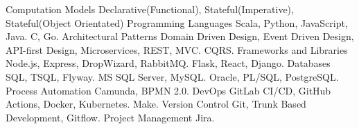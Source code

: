   \begin{cvskills}
    \cvskill
      {Computation Models} %
      { Declarative(Functional), Stateful(Imperative), Stateful(Object Orientated)} %
    \cvskill
      {Programming Languages} %
      {  Scala, Python, JavaScript, Java.}
    \cvskill
      {} %
      {  C, Go.}
    \cvskill
      {Architectural Patterns} %
      {  Domain Driven Design, Event Driven Design, API-first Design, Microservices, REST, MVC.}
    \cvskill
      {} %
      {  CQRS.}
    \cvskill
      {Frameworks and Libraries} %
      {  Node.js, Express, DropWizard, RabbitMQ.}
    \cvskill
      {}
      {  Flask, React, Django.}
    \cvskill
    {Databases} %
    {  SQL, TSQL, Flyway.}
    \cvskill
    {} %
    {  MS SQL Server, MySQL.}
    \cvskill
    {} %
    {  Oracle, PL/SQL, PostgreSQL.}
    \cvskill
      {Process Automation}
      { Camunda, BPMN 2.0.}
    \cvskill
    {DevOps} %
      { GitLab CI/CD, GitHub Actions, Docker, Kubernetes.} %
    \cvskill
      {} %
      {  Make.}
    \cvskill
    {Version Control} %
    { Git, Trunk Based Development, Gitflow.} %
    \cvskill
    {Project Management} %
    { Jira.} %
  \end{cvskills}
